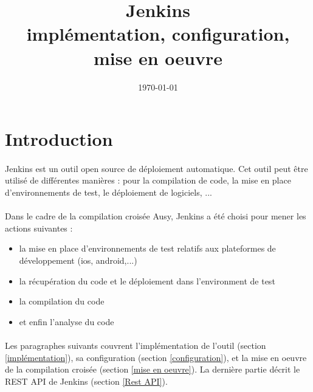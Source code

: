 \documentclass{article}
\title{Jenkins\\implémentation, configuration, mise en oeuvre}
\date{\today}
\begin{document}
\maketitle


\tableofcontents
\newpage

\section{Introduction}
\paragraph{}
Jenkins est un outil open source de déploiement automatique. Cet outil peut être utilisé de différentes manières : pour la compilation de code, la mise en place d'environnements de test, le déploiement de logiciels, ...\\

\paragraph{}
 Dans le cadre de la compilation croisée Ausy, Jenkins a été choisi pour mener les actions suivantes : 
 \begin{itemize}
  \item la mise en place d'environnements de test relatifs aux plateformes de développement (ios, android,...)
  \item la récupération du code et le déploiement dans l'environment de test
  \item la compilation du code
  \item et enfin l'analyse du code\\
\end{itemize}

\paragraph{}
Les paragraphes suivants couvrent l'implémentation de l'outil (section \ref{implémentation}), 
    sa configuration (section \ref{configuration}), 
    et la mise en oeuvre de la compilation croisée (section \ref{mise en oeuvre}). 
    La dernière partie décrit le REST API de Jenkins (section \ref{Rest API}).\\
\end{document}
